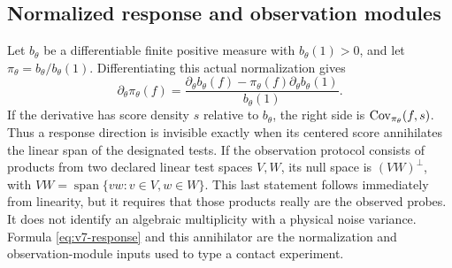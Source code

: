 \subsection{Normalized response and observation modules}
Let $b_\theta$ be a differentiable finite positive measure with
$b_\theta(1)>0$, and let $\pi_\theta=b_\theta/b_\theta(1)$.
Differentiating this actual normalization gives
\begin{equation}
 \partial_\theta\pi_\theta(f)=
 \frac{\partial_\theta b_\theta(f)
       -\pi_\theta(f)\partial_\theta b_\theta(1)}{b_\theta(1)}.
                                                               \label{eq:v7-response}
\end{equation}
If the derivative has score density $s$ relative to $b_\theta$, the
right side is $\operatorname{Cov}_{\pi_\theta}(f,s)$. Thus a response direction is
invisible exactly when its centered score annihilates the linear span
of the designated tests. If the observation protocol consists of
products from two declared linear test spaces $V,W$, its null space is
$(VW)^\perp$, with $VW=\operatorname{span}\{vw:v\in V,w\in W\}$.
This last statement follows immediately from linearity, but it requires
that those products really are the observed probes. It does not identify
an algebraic multiplicity with a physical noise variance. Formula
\eqref{eq:v7-response} and this annihilator are the normalization and
observation-module inputs used to type a contact experiment.
